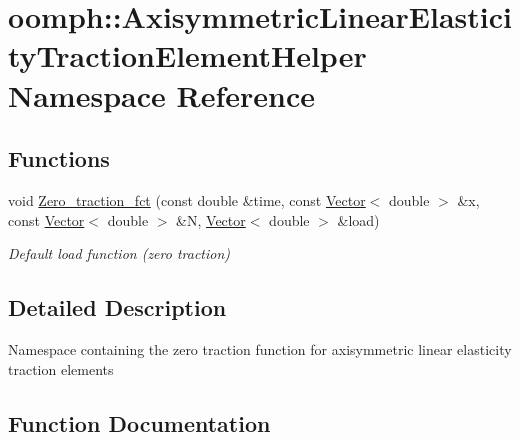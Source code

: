 \hypertarget{namespaceoomph_1_1AxisymmetricLinearElasticityTractionElementHelper}{}\section{oomph\+:\+:Axisymmetric\+Linear\+Elasticity\+Traction\+Element\+Helper Namespace Reference}
\label{namespaceoomph_1_1AxisymmetricLinearElasticityTractionElementHelper}
\subsection*{Functions}
\begin{DoxyCompactItemize}
\item 
void \hyperlink{namespaceoomph_1_1AxisymmetricLinearElasticityTractionElementHelper_a1a493ca2845b4c81260fa82e9219063f}{Zero\+\_\+traction\+\_\+fct} (const double \&time, const \hyperlink{classoomph_1_1Vector}{Vector}$<$ double $>$ \&x, const \hyperlink{classoomph_1_1Vector}{Vector}$<$ double $>$ \&N, \hyperlink{classoomph_1_1Vector}{Vector}$<$ double $>$ \&load)
\begin{DoxyCompactList}\small\item\em Default load function (zero traction) \end{DoxyCompactList}\end{DoxyCompactItemize}


\subsection{Detailed Description}
Namespace containing the zero traction function for axisymmetric linear elasticity traction elements 

\subsection{Function Documentation}
\mbox{\label{namespaceoomph_1_1AxisymmetricLinearElasticityTractionElementHelper_a1a493ca2845b4c81260fa82e9219063f}} 
